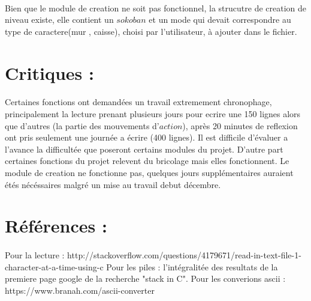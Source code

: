 \documentclass[a4paper]{article}
\begin{document}
  
  \paragraph{}
  Bien que le module de creation ne soit pas fonctionnel, la strucutre de creation de niveau existe, elle contient un $sokoban$ et un mode qui devait correspondre au type de caractere(mur , caisse), choisi par l'utilisateur, à ajouter dans le fichier.

  \section{Critiques :}
  \paragraph{}
  Certaines fonctions ont demandées un travail extremement chronophage, principalement la lecture prenant plusieurs jours pour ecrire une 150 lignes alors que d'autres (la partie des mouvements d'$action$), après 20 minutes de reflexion ont pris seulement une journée a écrire (400 lignes).
  Il est difficile d'évaluer a l'avance la difficultée que poseront certains modules du projet.
  D'autre part certaines fonctions du projet relevent du bricolage mais elles fonctionnent.
  Le module de creation ne fonctionne pas, quelques jours supplémentaires auraient étés nécéssaires malgré un mise au travail debut décembre.

  \section{Références :}
  \paragraph{}
  Pour la lecture : http://stackoverflow.com/questions/4179671/read-in-text-file-1-character-at-a-time-using-c  \hfill \break
  Pour les piles : l'intégralitée des resultats de la premiere page google de la recherche "stack in C". \hfill \break
  Pour les converions ascii : https://www.branah.com/ascii-converter
\end{document}

